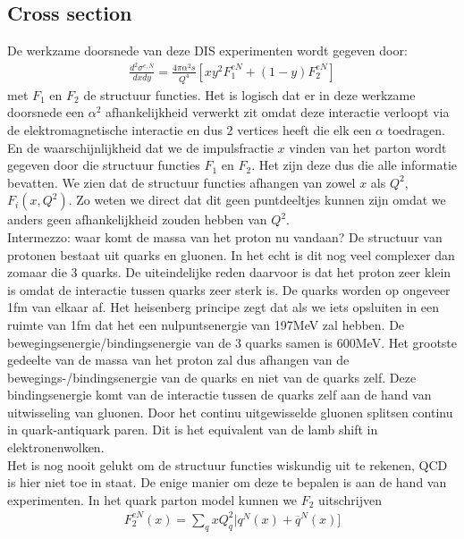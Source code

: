 \documentclass[../main.tex]{subfiles}
\begin{document}
\subsection{Cross section}%
\label{sub:cross_section}

De werkzame doorsnede van deze DIS experimenten wordt gegeven door:
\begin{equation}
    \begin{aligned}
        \label{eq:dis_werkzame_doorsnede}
        \frac{d^2\sigma^{e,N}}{dxdy} = \frac{4\pi\alpha^2s}{Q^4} [xy^2F_1^{eN}+(1-y)F_2^{eN}]
    \end{aligned}
\end{equation}
met $F_1$ en $F_2$ de structuur functies. Het is logisch dat er in deze werkzame doorsnede een $\alpha^2$ afhankelijkheid verwerkt zit omdat deze interactie verloopt via de elektromagnetische interactie en dus 2 vertices heeft die elk een $\alpha$ toedragen. En de waarschijnlijkheid dat we de impulsfractie $x$ vinden van het parton wordt gegeven door die structuur functies $F_1$ en $F_2$. Het zijn deze dus die alle informatie bevatten. We zien dat de structuur functies afhangen van zowel $x$ als $Q^2$, $F_i(x, Q^2)$. Zo weten we direct dat dit geen puntdeeltjes kunnen zijn omdat we anders geen afhankelijkheid zouden hebben van $Q^2$.\\
{\color{blue}Intermezzo: waar komt de massa van het proton nu vandaan? De structuur van protonen bestaat uit quarks en gluonen. In het echt is dit nog veel complexer dan zomaar die 3 quarks. De uiteindelijke reden daarvoor is dat het proton zeer klein is omdat de interactie tussen quarks zeer sterk is. De quarks worden op ongeveer 1fm van elkaar af. Het heisenberg principe zegt dat als we iets opsluiten in een ruimte van 1fm dat het een nulpuntsenergie van 197MeV zal hebben. De bewegingsenergie/bindingsenergie van de 3 quarks samen is 600MeV. Het grootste gedeelte van de massa van het proton zal dus afhangen van de bewegings-/bindingsenergie van de quarks en niet van de quarks zelf. Deze bindingsenergie komt van de interactie tussen de quarks zelf aan de hand van uitwisseling van gluonen. Door het continu uitgewisselde gluonen splitsen continu in quark-antiquark paren. Dit is het equivalent van de lamb shift in elektronenwolken.}\\
Het is nog nooit gelukt om de structuur functies wiskundig uit te rekenen, QCD is hier niet toe in staat. De enige manier om deze te bepalen is aan de hand van experimenten. In het quark parton model kunnen we $F_2$ uitschrijven
\begin{equation}
    \begin{aligned}
        \label{eq:tweede_structuur_functie}
        F_2^{eN}(x)=\sum_q xQ_q^2|q^N(x)+\overline q^N (x)]
    \end{aligned}
\end{equation}
\end{document}
